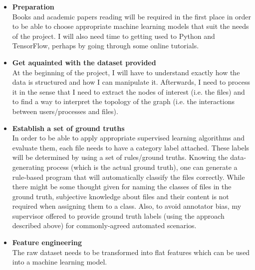 \begin{itemize}

  \item \textbf{Preparation} \\
        Books and academic papers reading will be required in the first place in order to be able to choose appropriate machine learning models that suit the needs of the project. I will also need time to getting used to Python and TensorFlow, perhaps by going through some online tutorials.\\

  \item \textbf{Get aquainted with the dataset provided} \\
        At the beginning of the project, I will have to understand exactly how the data is structured and how I can manipulate it. Afterwards, I need to process it in the sense that I need to extract the nodes of interest (i.e. the files) and to find a way to interpret the topology of the graph (i.e. the interactions between users/processes and files). \\

  \item \textbf{Establish a set of ground truths} \\
        In order to be able to apply appropriate supervised learning algorithms and  evaluate them, each file needs to have a category label attached. These labels will be determined by using a set of rules/ground truths. Knowing the data-generating process (which is the actual ground truth), one can generate a rule-based program that will automatically classify the files correctly. While there might be some thought given for naming the classes of files in the ground truth, subjective knowledge about files and their content is not required when assigning them to a class.
        Also, to avoid annotator bias, my supervisor offered to provide ground truth labels (using the approach described above) for commonly-agreed automated scenarios.\newpage

  \item \textbf{Feature engineering} \\
        The raw dataset needs to be transformed into flat features which can be used into a machine learning model.\\


\end{itemize}
